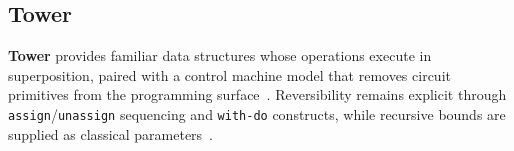 \subsection{Tower}\label{subsec:system_descriptions:tower}
\textbf{Tower} provides familiar data structures whose operations execute in superposition, paired with a control machine model that removes circuit primitives from the programming surface~\cite{yuan2025foundationalabstractions}.
Reversibility remains explicit through \texttt{assign}/\texttt{unassign} sequencing and \texttt{with-do} constructs, while recursive bounds are supplied as classical parameters~\cite{yuan2025foundationalabstractions}.